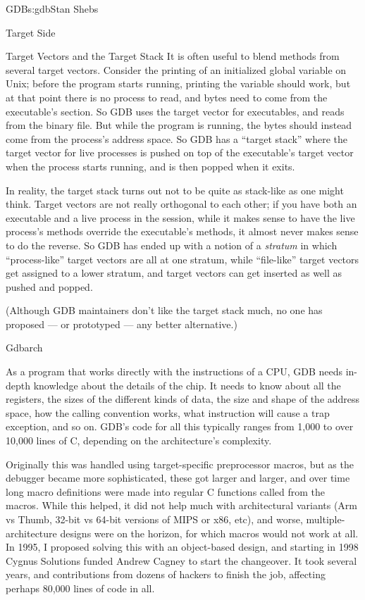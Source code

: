 \begin{aosachapter}{GDB}{s:gdb}{Stan Shebs}
\begin{aosasect1}{Target Side}
\begin{aosasect2}{Target Vectors and the Target Stack}
It is often useful to blend methods from several target vectors.
Consider the printing of an initialized global variable on Unix;
before the program starts running, printing the variable should work,
but at that point there is no process to read, and bytes need to come
from the executable's  section.  So GDB uses the target
vector for executables, and reads from the binary file.  But while the
program is running, the bytes should instead come from the process's
address space.  So GDB has a ``target stack'' where the target vector
for live processes is pushed on top of the executable's target vector
when the process starts running, and is then popped when it exits.

In reality, the target stack turns out not to be quite as stack-like
as one might think.  Target vectors are not really orthogonal to each
other; if you have both an executable and a live process in the
session, while it makes sense to have the live process's methods
override the executable's methods, it almost never makes sense to do
the reverse.  So GDB has ended up with a notion of a {\em stratum} in
which ``process-like'' target vectors are all at one stratum, while
``file-like'' target vectors get assigned to a lower stratum, and
target vectors can get inserted as well as pushed and popped.

(Although GDB maintainers don't like the target stack much, no one has
proposed --- or prototyped --- any better alternative.)

\end{aosasect2}

\begin{aosasect2}{Gdbarch}

As a program that works directly with the instructions of a CPU, GDB
needs in-depth knowledge about the details of the chip.  It needs to
know about all the registers, the sizes of the different kinds of
data, the size and shape of the address space, how the calling
convention works, what instruction will cause a trap exception, and so
on.  GDB's code for all this typically ranges from 1,000 to over
10,000 lines of C, depending on the architecture's complexity.

Originally this was handled using target-specific preprocessor macros,
but as the debugger became more sophisticated, these got larger and
larger, and over time long macro definitions were made into regular C
functions called from the macros.  While this helped, it did not help
much with architectural variants (Arm vs Thumb, 32-bit vs 64-bit
versions of MIPS or x86, etc), and worse, multiple-architecture
designs were on the horizon, for which macros would not work at all.
In 1995, I proposed solving this with an object-based design, and
starting in 1998 Cygnus Solutions funded Andrew Cagney to start the
changeover.  It took several years, and contributions from dozens of
hackers to finish the job, affecting perhaps 80,000 lines of code in
all.


\end{aosasect2}
\end{aosasect1}
\end{aosachapter}
